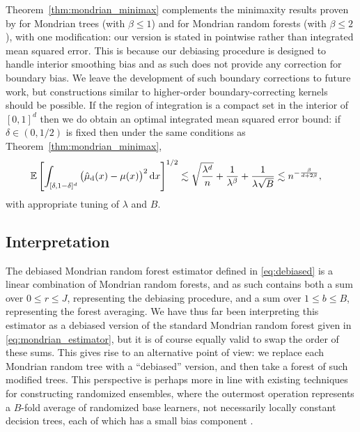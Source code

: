 Theorem~\ref{thm:mondrian_minimax} complements the minimaxity results
proven by \citet{mourtada2020minimax} for
Mondrian trees (with $\beta \leq 1$) and for Mondrian random forests
(with $\beta \leq 2$), with one modification:
our version is stated in pointwise rather than integrated
mean squared error.
This is because our debiasing procedure is designed to handle
interior smoothing bias and as such does not provide any correction
for boundary bias.
We leave the development of such boundary corrections to future work,
but constructions similar to higher-order boundary-correcting
kernels should be possible.
If the region of integration is a compact set
in the interior of $[0,1]^d$
then we do obtain an optimal integrated mean squared error bound:
if $\delta \in (0, 1/2)$ is fixed then under the
same conditions as Theorem~\ref{thm:mondrian_minimax},
%
\begin{align*}
  \mathbb{E} \left[
    \int_{[\delta, 1-\delta]^d}
    \big(
      \hat \mu_{\mathrm{d}}(x)
      - \mu(x)
    \big)^2
    \,\mathrm{d}x
  \right]^{1/2}
  &\lesssim
  \sqrt{\frac{\lambda^d}{n}}
  + \frac{1}{\lambda^\beta}
  + \frac{1}{\lambda \sqrt B}
  \lesssim
  n^{-\frac{\beta}{d + 2 \beta}},
\end{align*}
%
with appropriate tuning of $\lambda$ and $B$.

\subsection{Interpretation}

The debiased Mondrian random forest estimator defined in \eqref{eq:debiased}
is a linear combination of Mondrian random forests,
and as such contains both a sum over $0 \leq r \leq J$,
representing the debiasing procedure,
and a sum over $1 \leq b \leq B$, representing the forest averaging.
We have thus far been interpreting this estimator as a debiased
version of the standard Mondrian random forest given in
\eqref{eq:mondrian_estimator},
but it is of course equally valid to swap the order of these sums.
This gives rise to an alternative point of view:
we replace each Mondrian random tree with a ``debiased'' version,
and then take a forest of such modified trees.
This perspective is perhaps more in line with existing
techniques for constructing
randomized ensembles, where the outermost operation
represents a $B$-fold average
of randomized base learners, not necessarily locally constant decision trees,
each of which has a small bias component
\citep{caruana2004ensemble, zhou2019deep, friedberg2020local}.

